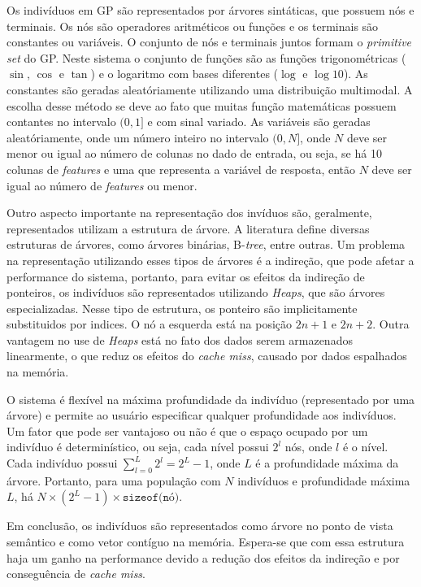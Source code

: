 \documentclass[a4paper]{paper}
\begin{document}
Os indivíduos em GP são representados por árvores sintáticas, que possuem nós e
terminais. Os nós são operadores aritméticos ou funções e os terminais são
constantes ou variáveis. O conjunto de nós e terminais juntos formam o
\textit{primitive set} do GP. Neste sistema o conjunto de funções são as funções
trigonométricas ($\sin$, $\cos$ e $\tan$) e o logaritmo com bases diferentes
($\log$ e $\log10$). As constantes são geradas aleatóriamente utilizando uma
distribuição multimodal. A escolha desse método se deve ao fato que muitas
função matemáticas possuem contantes no intervalo $(0, 1]$ e com sinal variado.
  As variáveis são geradas aleatóriamente, onde um número inteiro no intervalo
  $(0, N]$, onde $N$ deve ser menor ou igual ao número de colunas no dado de
    entrada, ou seja, se há 10 colunas de \textit{features} e uma que representa
    a variável de resposta, então $N$ deve ser igual ao número de
    \textit{features} ou menor.

Outro aspecto importante na representação dos invíduos são, geralmente,
representados utilizam a estrutura de árvore. A literatura define diversas
estruturas de árvores, como árvores binárias, B-\textit{tree}, entre outras. Um
problema na representação utilizando esses tipos de árvores é a indireção, que
pode afetar a performance do sistema, portanto, para evitar os efeitos da
indireção de ponteiros, os indivíduos são representados utilizando
\textit{Heaps}, que são árvores especializadas. Nesse tipo de estrutura, os
ponteiro são implicitamente substituidos por indices. O nó a esquerda está na
posição $2n+1$ e $2n + 2$. Outra vantagem no use de \textit{Heaps} está no fato
dos dados serem armazenados linearmente, o que reduz os efeitos do \textit{cache
  miss}, causado por dados espalhados na memória.

O sistema é flexível na máxima profundidade da indivíduo (representado por uma
árvore) e permite ao usuário especificar qualquer profundidade aos indivíduos.
Um fator que pode ser vantajoso ou não é que o espaço ocupado por um indivíduo
é determinístico, ou seja, cada nível possui $2^l$ nós, onde $l$ é o nível.
Cada indivíduo possui $\sum_{l=0}^{L}2^l=2^{L}-1$, onde $L$ é a profundidade máxima
da árvore. Portanto, para uma população com $N$ indivíduos e profundidade máxima
$L$, há $N\times(2^{L}-1)\times\texttt{sizeof(nó)}$.

Em conclusão, os indivíduos são representados como árvore no ponto de vista
semântico e como vetor contíguo na memória.  Espera-se que com essa estrutura
haja um ganho na performance devido a redução dos efeitos da indireção e por
conseguência de \textit{cache miss}.
\end{document}
